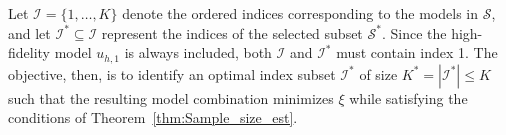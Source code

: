 

Let $\mathcal{I} = \{1,\ldots,K\}$ denote the ordered indices corresponding to the models in $\mathcal{S}$, and let $\mathcal{I}^*\subseteq \mathcal{I}$ represent the indices of the selected subset $\mathcal{S}^*$. Since the high-fidelity model $u_{h,1}$ is always included, both $\mathcal{I}$ and $\mathcal{I}^*$ must contain index 1. The objective, then, is to identify an optimal index subset $\mathcal{I}^*$ of size $K^* = |\mathcal{I}^*| \leq K$ such that the resulting model combination minimizes $\xi$ while satisfying the conditions of Theorem~\ref{thm:Sample_size_est}.


